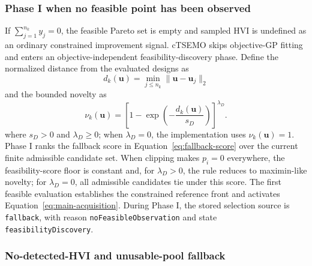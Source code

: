 \documentclass[twoside]{article}
\begin{document}
\subsubsection{Phase I when no feasible point has been observed}
\label{sec:phase-one}

If \(\sum_{j=1}^{n_k}y_j=0\), the feasible Pareto set is empty and sampled HVI
is undefined as an ordinary constrained improvement signal.  cTSEMO skips
objective-GP fitting and enters an objective-independent
feasibility-discovery phase. Define the normalized distance from the evaluated
designs as
\begin{equation}
  d_k(\mathbf{u})=
  \min_{j\leq n_k}\|\mathbf{u}-\mathbf{u}_j\|_2
  \label{eq:min-distance}
\end{equation}
and the bounded novelty as
\begin{equation}
  \nu_k(\mathbf{u})
  =
  \left[
  1-\exp\!\left(-\frac{d_k(\mathbf{u})}{s_D}\right)
  \right]^{\lambda_D}.
  \label{eq:fallback-novelty}
\end{equation}
where \(s_D>0\) and \(\lambda_D\geq0\); when \(\lambda_D=0\), the
implementation uses \(\nu_k(\mathbf{u})=1\).
Phase I ranks the fallback score in
Equation~\eqref{eq:fallback-score} over the current finite admissible
candidate set. When clipping makes \(p_i=0\) everywhere,
the feasibility-score floor is constant and, for \(\lambda_D>0\), the rule
reduces to maximin-like novelty; for \(\lambda_D=0\), all admissible candidates
tie under this score.
The first feasible evaluation establishes the constrained reference front and
activates Equation~\eqref{eq:main-acquisition}. During Phase I, the stored selection source is \texttt{fallback}, with
reason \texttt{noFeasibleObservation} and state
\texttt{feasibilityDiscovery}.

\subsubsection{No-detected-HVI and unusable-pool fallback}
\end{document}
